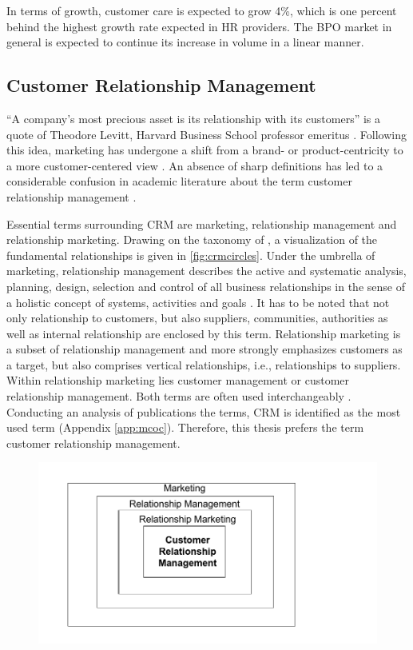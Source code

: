		In terms of growth, customer care is expected to grow 4\%, which is one percent behind the highest growth rate expected in HR providers. The \acrshort{BPO} market in general is expected to continue its increase in volume in a linear manner. 
		\subsection{Customer Relationship Management}
		\label{sec:crm}
		\enquote{A company's most precious asset is its relationship with its customers} is a quote of Theodore Levitt, Harvard Business School professor emeritus \citep{levitt1983}. Following this idea, marketing has undergone a shift from a brand- or product-centricity to a more customer-centered view \citep{Chen_2003}. An absence of sharp definitions has led to a considerable confusion in academic literature about the term customer relationship management \citep{paynefrow2005}. 
		
		Essential terms surrounding CRM are marketing, relationship management and relationship marketing. Drawing on the taxonomy of \cite{Leuer2011}, a visualization of the fundamental relationships is given in \Fig \ref{fig:crmcircles}. Under the umbrella of marketing, relationship management describes the active and systematic analysis, planning, design, selection and control of all business relationships in the sense of a holistic concept of systems, activities and goals \citep[]{diller1995}. It has to be noted that not only relationship to customers, but also suppliers, communities, authorities as well as internal relationship are enclosed by this term. Relationship marketing is a subset of relationship management and more strongly emphasizes customers as a target, but also comprises vertical relationships, i.e., relationships to suppliers. Within relationship marketing lies customer management or customer relationship management. Both terms are often used interchangeably  \citep{Leuer2011,ryals2001customer}. Conducting an analysis of publications \wrt the terms, \acrshort{CRM} is identified as the most used term (\cf Appendix \ref{app:mcoc}). Therefore, this thesis prefers the term customer relationship management.
		
		\begin{figure}[caption={CRM in the Field of Marketing}, label={fig:crmcircles}]
			{	\includegraphics[width=.8\textwidth]{figures/crmcircles.pdf}}
		\end{figure}
	
